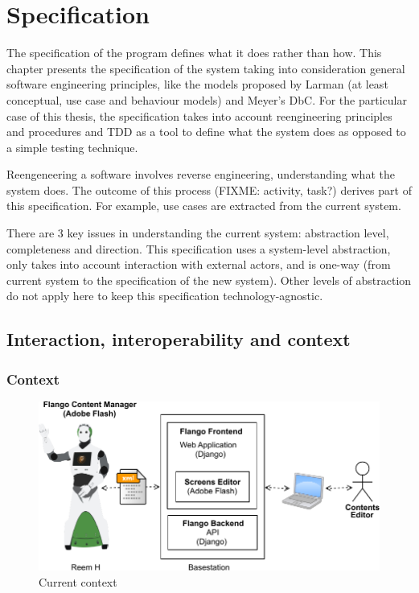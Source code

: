 \chapter{Specification}
The specification of the program defines what it does rather than how.
This chapter presents the specification of the system taking into consideration general software engineering principles, like the models proposed by Larman (at least conceptual, use case and behaviour models) and Meyer's \ac{DbC}.
For the particular case of this thesis, the specification takes into account reengineering principles and procedures and \ac{TDD} as a tool to define what the system does as opposed to a simple testing technique.

Reengeneering a software involves reverse engineering, understanding what the system does.
The outcome of this process (FIXME: activity, task?) derives part of this specification.
For example, use cases are extracted from the current system.

There are 3 key issues in understanding the current system: abstraction level, completeness and direction.
This specification uses a system-level abstraction, only takes into account interaction with external actors, and is one-way (from current system to the specification of the new system).
Other levels of abstraction do not apply here to keep this specification technology-agnostic.


\section{Interaction, interoperability and context}

\subsection{Context}
\begin{figure}[htb]
    \label{fig:context-original}
    \centering
    \includegraphics[width=\textwidth]{figures/context-original}
    \caption{Current context}
\end{figure}


